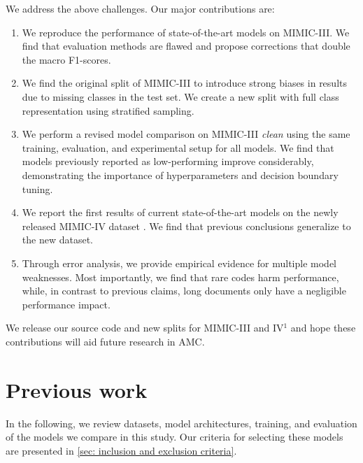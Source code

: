 {We address the above challenges. Our major contributions are:
\begin{enumerate}
    \item We reproduce the performance of state-of-the-art models on MIMIC-III. We find that evaluation methods are flawed and propose corrections that double the macro F1-scores.
    \item We find the original split of MIMIC-III to introduce strong biases in results due to missing classes in the test set. We create a new split with full class representation using stratified sampling.
    \item We perform a revised model comparison on MIMIC-III \textit{clean} using the same training, evaluation, and experimental setup for all models. We find that models previously reported as low-performing improve considerably, demonstrating the importance of hyperparameters and decision boundary tuning.
    \item We report the first results of current state-of-the-art models on the newly released MIMIC-IV dataset \parencite{johnsonMIMICIVFreelyAccessible2023, goldbergerPhysioBankPhysioToolkitPhysioNet2000}. We find that previous conclusions generalize to the new dataset.
    \item Through error analysis, we provide empirical evidence for multiple model weaknesses. Most importantly, we find that rare codes harm performance, while, in contrast to previous claims, long documents only have a negligible performance impact.
\end{enumerate}
We release our source code and new splits for MIMIC-III and IV$^\text{1}$
and hope these contributions will aid future research in AMC.


\section{Previous work}

In the following, we review datasets, model architectures, training, and evaluation of the models we compare in this study. Our criteria for selecting these models are presented in \cref{sec: inclusion and exclusion criteria}.

}
